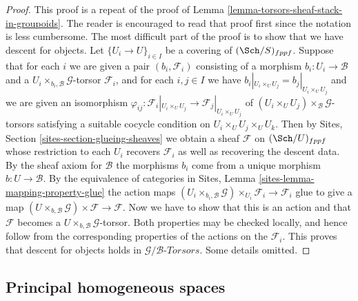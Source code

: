 \begin{proof}
This proof is a repeat of the proof of
Lemma \ref{lemma-torsors-sheaf-stack-in-groupoids}.
The reader is encouraged to read that proof first since
the notation is less cumbersome.
The most difficult part of the proof is to show that
we have descent for objects. Let $\{U_i \to U\}_{i \in I}$
be a covering of $(\Sch/S)_{fppf}$.
Suppose that for each $i$ we are given a pair $(b_i, \mathcal{F}_i)$
consisting of a morphism $b_i : U_i \to \mathcal{B}$ and a
$U_i \times_{b_i, \mathcal{B}} \mathcal{G}$-torsor
$\mathcal{F}_i$, and for each $i, j \in I$
we have $b_i|_{U_i \times_U U_j} = b_j|_{U_i \times_U U_j}$ and
we are given an isomorphism
$\varphi_{ij} :
\mathcal{F}_i|_{U_i \times_U U_j} \to \mathcal{F}_j|_{U_i \times_U U_j}$
of $(U_i \times_U U_j) \times_\mathcal{B} \mathcal{G}$-torsors
satisfying a suitable cocycle condition on $U_i \times_U U_j \times_U U_k$.
Then by
Sites, Section \ref{sites-section-glueing-sheaves}
we obtain a sheaf $\mathcal{F}$ on $(\Sch/U)_{fppf}$
whose restriction to each $U_i$ recovers $\mathcal{F}_i$ as well
as recovering the descent data. By the sheaf axiom for $\mathcal{B}$
the morphisms $b_i$ come from a unique morphism $b : U \to \mathcal{B}$.
By the equivalence of categories in
Sites, Lemma \ref{sites-lemma-mapping-property-glue}
the action maps
$(U_i \times_{b_i, \mathcal{B}} \mathcal{G}) \times_{U_i} \mathcal{F}_i
\to \mathcal{F}_i$
glue to give a map
$(U \times_{b, \mathcal{B}} \mathcal{G}) \times \mathcal{F} \to \mathcal{F}$.
Now we have to show that this is an action and that $\mathcal{F}$ becomes
a $U \times_{b, \mathcal{B}} \mathcal{G}$-torsor.
Both properties may be checked locally, and
hence follow from the corresponding properties of the actions
on the $\mathcal{F}_i$.
This proves that descent for objects holds in
$\mathcal{G}/\mathcal{B}\textit{-Torsors}$.
Some details omitted.
\end{proof}



\subsection{Principal homogeneous spaces}
\label{subsection-principal-homogeneous-spaces}

